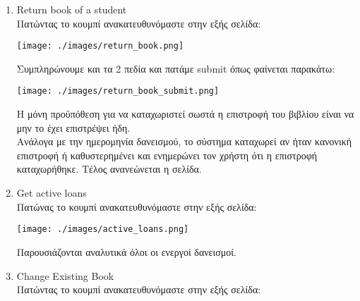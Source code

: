\documentclass[14pt]{report}
\begin{document}
\begin{enumerate}
		\newpage
		\hypertarget{o-return-book}{}
		\item Return book of a student \\
		Πατώντας το κουμπί ανακατευθυνόμαστε στην εξής σελίδα: \\
		
		\vspace{\baselineskip}
		
		\texttt{[image: ./images/return\_book.png]}
		
		\vspace{\baselineskip}
		
		\newpage
		Συμπληρώνουμε και τα 2 πεδία και πατάμε submit όπως φαίνεται παρακάτω: \\
		
		\vspace{\baselineskip}
		
		\texttt{[image: ./images/return\_book\_submit.png]}
		
		\vspace{\baselineskip}
		
		Η μόνη προϋπόθεση για να καταχωριστεί σωστά η επιστροφή του βιβλίου είναι να μην το έχει επιστρέψει ήδη. \\
		Ανάλογα με την ημερομηνία δανεισμού, το σύστημα καταχωρεί αν ήταν κανονική επιστροφή ή καθυστερημένει και ενημερώνει τον χρήστη ότι η επιστροφή καταχωρήθηκε. Τέλος ανανεώνεται η σελίδα. \\
		
		\newpage
		\hypertarget{o-get-active-loans}{}
		\item Get active loans \\
		Πατώνας το κουμπί ανακατευθυνόμαστε στην εξής σελίδα: \\
		
		\vspace{\baselineskip}
		
		\texttt{[image: ./images/active\_loans.png]}
		
		\vspace{\baselineskip}
		
		Παρουσιάζονται αναλυτικά όλοι οι ενεργοί δανεισμοί. \\
		
		\newpage
		\hypertarget{o-change-book}{}
		\item  Change Existing Book \\
		Πατώντας το κουμπί ανακατευθυνόμαστε στην εξής σελίδα: \\
		

\end{enumerate}
\end{document}
